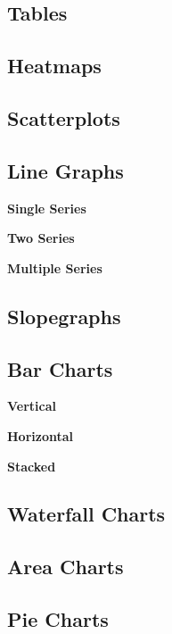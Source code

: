 \documentclass[]{book}
\begin{document}
\hypertarget{tables}{%
\subsection{Tables}\label{tables}}

\hypertarget{heatmaps}{%
\subsection{Heatmaps}\label{heatmaps}}

\hypertarget{scatterplots}{%
\subsection{Scatterplots}\label{scatterplots}}

\hypertarget{line-graphs}{%
\subsection{Line Graphs}\label{line-graphs}}

\textbf{Single Series}

\textbf{Two Series}

\textbf{Multiple Series}

\hypertarget{slopegraphs}{%
\subsection{Slopegraphs}\label{slopegraphs}}

\hypertarget{bar-charts}{%
\subsection{Bar Charts}\label{bar-charts}}

\textbf{Vertical}

\textbf{Horizontal}

\textbf{Stacked}

\hypertarget{waterfall-charts}{%
\subsection{Waterfall Charts}\label{waterfall-charts}}

\hypertarget{area-charts}{%
\subsection{Area Charts}\label{area-charts}}

\hypertarget{pie-charts}{%
\subsection{Pie Charts}\label{pie-charts}}
\end{document}
